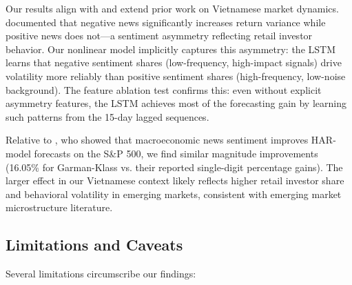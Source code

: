 Our results align with and extend prior work on Vietnamese market dynamics. \citet{vu2023sentiments} documented that negative news significantly increases return variance while positive news does not—a sentiment asymmetry reflecting retail investor behavior. Our nonlinear model implicitly captures this asymmetry: the LSTM learns that negative sentiment shares (low-frequency, high-impact signals) drive volatility more reliably than positive sentiment shares (high-frequency, low-noise background). The feature ablation test confirms this: even without explicit asymmetry features, the LSTM achieves most of the forecasting gain by learning such patterns from the 15-day lagged sequences.

Relative to \citet{bodilsen2025exploiting}, who showed that macroeconomic news sentiment improves HAR-model forecasts on the S\&P 500, we find similar magnitude improvements (16.05\% for Garman-Klass vs. their reported single-digit percentage gains). The larger effect in our Vietnamese context likely reflects higher retail investor share and behavioral volatility in emerging markets, consistent with emerging market microstructure literature.

\subsection{Limitations and Caveats}

Several limitations circumscribe our findings:

